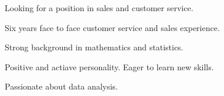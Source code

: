 

\begin{cventries}

  \cventry
    {} %
    {} %
    {} %
    {} %
    {
      \begin{cvitems} %
      \item Looking for a position in sales and customer service.
      \item Six years face to face customer service and sales experience.
      \item Strong background in mathematics and statistics.
      \item Positive and actiave personality.  Eager to learn new skills.
      \item Passionate about data analysis. 
      \end{cvitems}
    }


\end{cventries}
